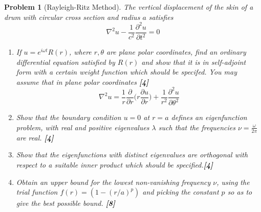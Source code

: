 \documentclass[a4paper]{article}
\theoremstyle{new}
\newtheorem{qns}{Problem}[section]
\begin{document}
\begin{qns}[Rayleigh-Ritz Method]
The vertical displacement of the skin of a drum with circular cross section and radius $a$ satisfies
$$\nabla^2u-\frac{1}{c^2}\frac{\partial^2u}{\partial t^2}=0$$
\begin{enumerate}[label=(\roman*)]
\item If $u=e^{i\omega t}R(r)$, where $r,\theta$ are plane polar coordinates, find an ordinary differential equation satisfied by $R(r)$ and show that it is in self-adjoint form with a certain weight function which should be specifed. You may assume that in plane polar coordinates \hfill \textbf{[4]}
$$\nabla^2u=\frac{1}{r}\frac{\partial}{\partial r}\bigg(r\frac{\partial u}{\partial r}\bigg)+\frac{1}{r^2}\frac{\partial^2u}{\partial\theta^2}$$
\item Show that the boundary condition $u = 0$ at $r = a$ defines an eigenfunction problem, with real and positive eigenvalues $\lambda$ such that the frequencies $\nu=\frac{\omega}{2\pi}$ are real. \hfill \textbf{[4]}
\item Show that the eigenfunctions with distinct eigenvalues are orthogonal with respect to a suitable inner product which should be specified.\hfill \textbf{[4]}
\item Obtain an upper bound for the lowest non-vanishing frequency $\nu$, using the trial function $f(r)=(1-(r/a)^p)$ and picking the constant $p$ so as to give the best possible bound. \hfill \textbf{[8]}
\end{enumerate}
\end{qns}
\end{document}
